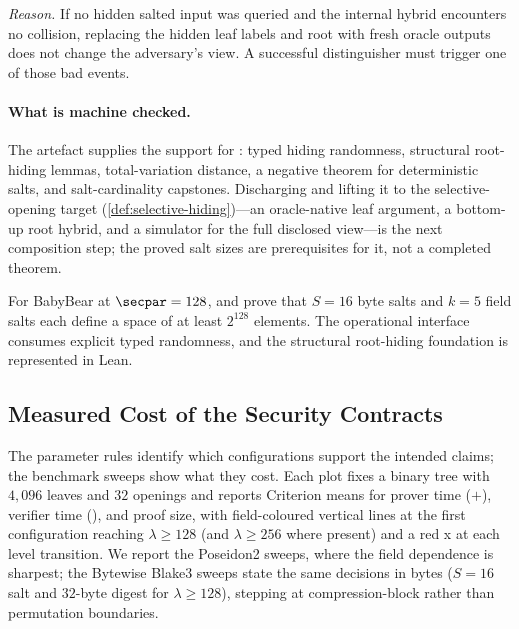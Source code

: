\noindent\emph{Reason.}
If no hidden salted input was queried and the internal hybrid encounters no
collision, replacing the hidden leaf labels and root with fresh oracle outputs
does not change the adversary's view.  A successful distinguisher must trigger
one of those bad events.

\paragraph{What is machine checked.}
The artefact supplies the support for : typed hiding
randomness, structural root-hiding lemmas, total-variation distance, a negative
theorem for deterministic salts, and salt-cardinality capstones.  Discharging
 and lifting it to the selective-opening target
(\cref{def:selective-hiding})---an oracle-native leaf argument, a bottom-up root
hybrid, and a simulator for the full disclosed view---is the next composition
step; the proved salt sizes are prerequisites for it, not a completed theorem.

\begin{finding}\label{finding:hiding}
For BabyBear at $\secpar=128$,
 and
 prove that $S=16$ byte salts and $k=5$
field salts each define a space of at least $2^{128}$ elements.  The
operational interface consumes explicit typed randomness, and the structural
root-hiding foundation is represented in Lean.
\end{finding}

\subsection{Measured Cost of the Security Contracts}

The parameter rules identify which configurations support the intended claims;
the benchmark sweeps show what they cost.  Each plot fixes a binary tree with
$4{,}096$ leaves and $32$ openings and reports Criterion means for prover time
($+$), verifier time (), and proof size,
with field-coloured vertical lines at the first configuration reaching
$\lambda\ge128$ (and $\lambda\ge256$ where present) and a red \textsf{x} at each
level transition.  We report the Poseidon2 sweeps, where the field dependence is
sharpest; the Bytewise Blake3 sweeps state the same decisions in bytes ($S=16$
salt and $32$-byte digest for $\lambda\ge128$), stepping at compression-block
rather than permutation boundaries.

